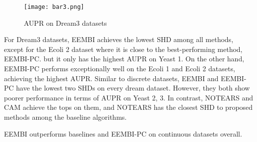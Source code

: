 \documentclass[twoside,11pt]{article}
\begin{document}
\begin{table*}[htpb]
\centering
\fontsize{10}{18}\selectfont
\caption{SHD on Dream3 datasets}\label{Dream3 SHD}
\end{table*}




\begin{figure*}
\centering
\texttt{[image: bar3.png]}
\caption{AUPR on Dream3 datasets}\label{Dream3 AUPR}
\end{figure*}




For Dream3 datasets, EEMBI achieves the lowest SHD among all methods, except for the Ecoli 2 dataset where it is close to the best-performing method, EEMBI-PC. but it only has the highest AUPR on Yeast 1. On the other hand, EEMBI-PC performs exceptionally well on the Ecoli 1 and Ecoli 2 datasets, achieving the highest AUPR. Similar to discrete datasets, EEMBI and EEMBI-PC have the lowest two SHDs on every dream dataset. However, they both show poorer performance in terms of AUPR on Yeast 2, 3. In contrast, NOTEARS and CAM achieve the tops on them, and NOTEARS has the closest SHD to proposed methods among the baseline algorithms.

EEMBI outperforms baselines and EEMBI-PC on continuous datasets overall. 
\end{document}

